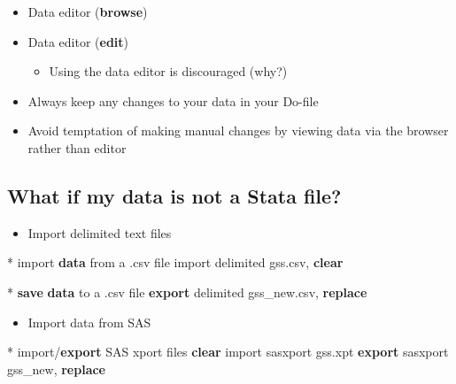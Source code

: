 \documentclass[]{book}
\newenvironment{Shaded}{\begin{snugshade}}{\end{snugshade}}
\newcommand{\KeywordTok}[1]{\textcolor[rgb]{0.13,0.29,0.53}{\textbf{#1}}}
\newcommand{\NormalTok}[1]{#1}
\providecommand{\tightlist}{%
  \setlength{\itemsep}{0pt}\setlength{\parskip}{0pt}}
\begin{document}
\begin{itemize}
\tightlist
\item
  Data editor (\textbf{browse})
\item
  Data editor (\textbf{edit})

  \begin{itemize}
  \tightlist
  \item
    Using the data editor is discouraged (why?)
  \end{itemize}
\item
  Always keep any changes to your data in your Do-file
\item
  Avoid temptation of making manual changes by viewing data via the browser rather than editor
\end{itemize}

\hypertarget{what-if-my-data-is-not-a-stata-file}{%
\subsection{What if my data is not a Stata file?}\label{what-if-my-data-is-not-a-stata-file}}

\begin{itemize}
\tightlist
\item
  Import delimited text files
\end{itemize}

\begin{Shaded}
\begin{Highlighting}[]
\NormalTok{* import }\KeywordTok{data}\NormalTok{ from a .csv file}
\NormalTok{import delimited gss.csv, }\KeywordTok{clear}

\NormalTok{* }\KeywordTok{save} \KeywordTok{data}\NormalTok{ to a .csv file}
\KeywordTok{export}\NormalTok{ delimited gss_new.csv, }\KeywordTok{replace}
\end{Highlighting}
\end{Shaded}

\begin{itemize}
\tightlist
\item
  Import data from SAS
\end{itemize}

\begin{Shaded}
\begin{Highlighting}[]
\NormalTok{* import/}\KeywordTok{export}\NormalTok{ SAS xport files}
\KeywordTok{clear}
\NormalTok{import sasxport gss.xpt}
\KeywordTok{export}\NormalTok{ sasxport gss_new, }\KeywordTok{replace}
\end{Highlighting}
\end{Shaded}
\end{document}
